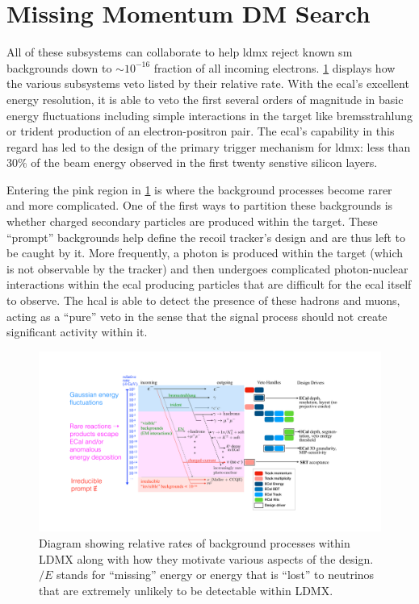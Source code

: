 \section{Missing Momentum DM Search}
All of these subsystems can collaborate to help \ac{ldmx} reject known \ac{sm} backgrounds
down to $\sim 10^{-16}$ fraction of all incoming electrons. \cref{fig:ldmx-bkgd-staircase}
displays how the various subsystems veto listed by their relative rate.
With the \ac{ecal}'s excellent energy resolution, it is able to veto the first several
orders of magnitude in basic energy fluctuations including simple interactions in the
target like bremsstrahlung or trident production of an electron-positron pair.
The \ac{ecal}'s capability in this regard has led to the design of the primary
trigger mechanism for \ac{ldmx}: less than $30\%$ of the beam energy observed in the
first twenty senstive silicon layers.

Entering the pink region in \cref{fig:ldmx-bkgd-staircase} is where the background processes
become rarer and more complicated. One of the first ways to partition these backgrounds is
whether charged secondary particles are produced within the target. These ``prompt'' backgrounds
help define the recoil tracker's design and are thus left to be caught by it. More frequently,
a photon is produced within the target (which is not observable by the tracker) and then undergoes
complicated photon-nuclear interactions within the \ac{ecal} producing particles that are difficult
for the \ac{ecal} itself to observe. The \ac{hcal} is able to detect the presence of these hadrons
and muons, acting as a ``pure'' veto in the sense that the signal process should not create
significant activity within it.

\begin{figure}
  \centering
  \includegraphics[width=\textwidth]{figures/ldmx/experiment/reaction_staircase_with_designDrivers.pdf}
  \caption{
    Diagram showing relative rates of background processes within LDMX along with
    how they motivate various aspects of the design. $\slash{E}$ stands for ``missing''
    energy or energy that is ``lost'' to neutrinos that are extremely unlikely to be
    detectable within LDMX.
  }
  \label{fig:ldmx-bkgd-staircase}
\end{figure}

